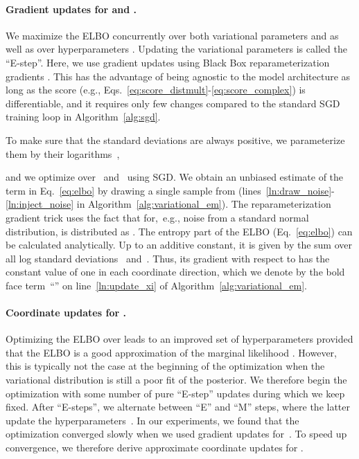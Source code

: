\documentclass[letterpage]{article}
\begin{document}
\paragraph{Gradient updates for  and .}
We maximize the ELBO concurrently over both variational parameters  and  as well as over hyperparameters .
Updating the variational parameters is called the ``E-step''.
Here, we use gradient updates using Black Box reparameterization gradients \citep{KW2014,RMW2014}.
This has the advantage of being agnostic to the model architecture as long as the score  (e.g., Eqs.~\ref{eq:score_distmult}-\ref{eq:score_complex}) is differentiable, and it requires only few changes compared to the standard SGD training loop in Algorithm~\ref{alg:sgd}.

To make sure that the standard deviations are always positive, we parameterize them by their logarithms~,

and we optimize over~ and~ using SGD.
We obtain an unbiased estimate of the term  in Eq.~\ref{eq:elbo} by drawing a single sample from  (lines~\ref{ln:draw_noise}-\ref{ln:inject_noise} in Algorithm~\ref{alg:variational_em}).
The reparameterization gradient trick uses the fact that for,~e.g., noise  from a standard normal distribution,  is distributed as .
The entropy part  of the ELBO (Eq.~\ref{eq:elbo}) can be calculated analytically.
Up to an additive constant, it is given by the sum over all log standard deviations ~and~.
Thus, its gradient with respect to  has the constant value of one in each coordinate direction, which we denote by the bold face term~``'' on line~\ref{ln:update_xi} of Algorithm~\ref{alg:variational_em}.

\paragraph{Coordinate updates for .}
Optimizing the ELBO over  leads to an improved set of hyperparameters provided that the ELBO is a good approximation of the marginal likelihood .
However, this is typically not the case at the beginning of the optimization when the variational distribution is still a poor fit of the posterior.
We therefore begin the optimization with some number  of pure ``E-step'' updates during which we keep  fixed.
After  ``E-steps'', we alternate between ``E'' and ``M'' steps, where the latter update the hyperparameters~.
In our experiments, we found that the optimization converged slowly when we used gradient updates for~.
To speed up convergence, we therefore derive approximate coordinate updates for .
\end{document}
